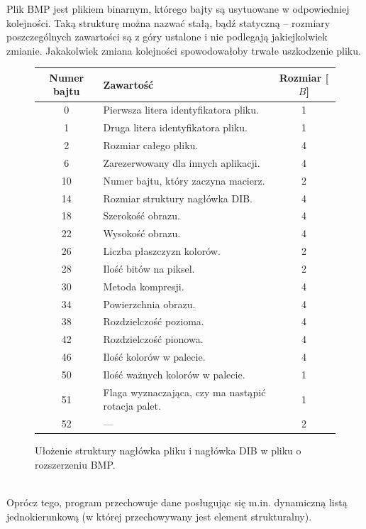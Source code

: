 \documentclass[12pt,a4paper,twoside]{article}
\newcounter{rok}
\begin{document}
Plik BMP jest plikiem binarnym, którego bajty są usytuowane w odpowiedniej kolejności. Taką strukturę można nazwać stałą, bądź statyczną – rozmiary poszczególnych zawartości są z góry ustalone i nie podlegają jakiejkolwiek zmianie. Jakakolwiek zmiana kolejności spowodowałoby trwałe uszkodzenie pliku.
\begin{figure}[hbt!]
\begin{center}
\begin{tabular} { |c|l|c| } 
\hline
 Numer bajtu & Zawartość & Rozmiar [$B$] \\ 
 \hline
 0  & Pierwsza litera identyfikatora pliku. & 1 \\ 
 1  & Druga litera identyfikatora pliku. & 1 \\ 
 2  & Rozmiar całego pliku. & 4 \\
 6  & Zarezerwowany dla innych aplikacji. & 4 \\
 10  & Numer bajtu, który zaczyna macierz. & 2 \\
 14 & Rozmiar struktury nagłówka DIB. & 4 \\
 18 & Szerokość obrazu. & 4 \\
 22 & Wysokość obrazu. & 4 \\
 26 & Liczba płaszczyzn kolorów. & 2 \\
 28 & Ilość bitów na piksel. & 2 \\
 30 & Metoda kompresji. & 4 \\
 34 & Powierzchnia obrazu. & 4 \\
 38 & Rozdzielczość pozioma. & 4 \\
 42 & Rozdzielczość pionowa. & 4 \\
 46 & Ilość kolorów w palecie. & 4 \\
 50 & Ilość ważnych kolorów w palecie. & 1 \\
 51 & Flaga wyznaczająca, czy ma nastąpić rotacja palet. & 1 \\
 52 & — & 2 \\
 \hline
\end{tabular}
\caption{Ułożenie struktury nagłówka pliku i nagłówka DIB w pliku o rozszerzeniu BMP.} \label{tab:tab1}
\end{center}
\end{figure}
\\
Oprócz tego, program przechowuje dane posługując się m.in. dynamiczną listą jednokierunkową (w której przechowywany jest element strukturalny). \par
\end{document}
